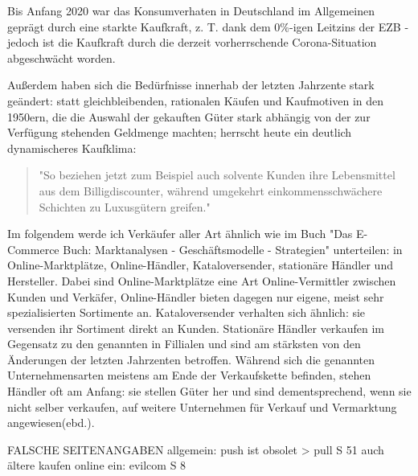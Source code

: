 \iffalse
Einteilung in: Online-Marktplätze + Online-Händler, Intermediäre, Kataloversender, stationäre Händler, Hersteller/Marken \cite{Graf}

entwicklung des kaufprozesses: graf:abbildung; 

https://edoc.sub.uni-hamburg.de/hcu/volltexte/2017/370/pdf/Ebert_Kirsten.pdf Anfang

änderung kaufablauf: \cite{Schaefers}
\fi

Bis Anfang 2020 war das Konsumverhaten in Deutschland im Allgemeinen geprägt durch eine starkte Kaufkraft, z. T. dank dem 0\%-igen Leitzins der \ac{EZB}\cite[S. 49]{Ebert} - jedoch ist die Kaufkraft durch die derzeit vorherrschende Corona-Situation abgeschwächt worden\cite{BfWE}. 

Außerdem haben sich die Bedürfnisse innerhab der letzten Jahrzente stark geändert: statt gleichbleibenden, rationalen Käufen und Kaufmotiven in den 1950ern, die die Auswahl der gekauften Güter stark abhängig von der zur Verfügung stehenden Geldmenge machten\cite[S. 38]{Schramm}; herrscht heute ein deutlich dynamischeres Kaufklima:
\begin{quote}
"So beziehen jetzt zum Beispiel auch solvente Kunden ihre Lebensmittel aus dem Billigdiscounter, während  umgekehrt  einkommensschwächere  Schichten  zu  Luxusgütern  greifen."\cite[S. 43]{Nitt}
\end{quote}

Im folgendem werde ich Verkäufer aller Art ähnlich wie im Buch "Das E-Commerce Buch: Marktanalysen - Geschäftsmodelle - Strategien" unterteilen: in Online-Marktplätze, Online-Händler, Kataloversender, stationäre Händler und Hersteller\cite[S. &15ff]{Graf}. Dabei sind Online-Marktplätze eine Art Online-Vermittler zwischen Kunden und Verkäfer, Online-Händler bieten dagegen nur eigene, meist sehr spezialisierten Sortimente an. Kataloversender verhalten sich ähnlich: sie versenden ihr Sortiment direkt an Kunden. Stationäre Händler verkaufen im Gegensatz zu den genannten in Fillialen und sind am stärksten von den Änderungen der letzten Jahrzenten betroffen. Während sich die genannten Unternehmensarten meistens am Ende der Verkaufskette befinden, stehen Händler oft am Anfang: sie stellen Güter her und sind dementsprechend, wenn sie nicht selber verkaufen, auf weitere Unternehmen für Verkauf und Vermarktung angewiesen(ebd.). %


\iffalse FALSCHE SEITENANGABEN 
    allgemein:
        push ist obsolet > pull S 51
        auch ältere kaufen online ein: evilcom S 8
        
